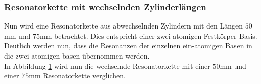 \subsubsection*{Resonatorkette mit wechselnden Zylinderlängen}
Nun wird eine Resonatorkette aus abwechselnden Zylindern mit den Längen $50$mm und $75$mm betrachtet.
Dies entspricht einer zwei-atomigen-Festkörper-Basis. Deutlich werden nun, dass die Resonanzen der einzelnen ein-atomigen Basen in 
die zwei-atomigen-basen übernommen werden.\\
In Abbildung \ref{fig:abwech_zylin} wird nun die wechselnde Resonatorkette mit einer $50$mm und einer $75$mm Resonatorkette verglichen.

\begin{figure}[H]
    \centering
    \hfil
    \hfil 
    \caption{}
    \label{fig:abwech_zylin}
\end{figure}

